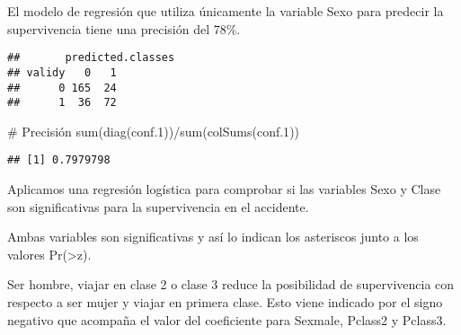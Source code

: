 \documentclass[
]{article}
\newenvironment{Shaded}{\begin{snugshade}}{\end{snugshade}}
\newcommand{\CommentTok}[1]{\textcolor[rgb]{0.50,0.62,0.50}{#1}}
\newcommand{\DataTypeTok}[1]{\textcolor[rgb]{0.87,0.87,0.75}{#1}}
\newcommand{\DecValTok}[1]{\textcolor[rgb]{0.86,0.86,0.80}{#1}}
\newcommand{\FloatTok}[1]{\textcolor[rgb]{0.75,0.75,0.82}{#1}}
\newcommand{\KeywordTok}[1]{\textcolor[rgb]{0.94,0.87,0.69}{#1}}
\newcommand{\NormalTok}[1]{\textcolor[rgb]{0.80,0.80,0.80}{#1}}
\newcommand{\OperatorTok}[1]{\textcolor[rgb]{0.94,0.94,0.82}{#1}}
\newcommand{\StringTok}[1]{\textcolor[rgb]{0.80,0.58,0.58}{#1}}
\begin{document}
El modelo de regresión que utiliza únicamente la variable Sexo para
predecir la supervivencia tiene una precisión del 78\%.

\begin{Shaded}
\end{Shaded}

\begin{verbatim}
##       predicted.classes
## validy   0   1
##      0 165  24
##      1  36  72
\end{verbatim}

\begin{Shaded}
\begin{Highlighting}[]
\CommentTok{# Precisión}
\KeywordTok{sum}\NormalTok{(}\KeywordTok{diag}\NormalTok{(conf}\FloatTok{.1}\NormalTok{))}\OperatorTok{/}\KeywordTok{sum}\NormalTok{(}\KeywordTok{colSums}\NormalTok{(conf}\FloatTok{.1}\NormalTok{))}
\end{Highlighting}
\end{Shaded}

\begin{verbatim}
## [1] 0.7979798
\end{verbatim}

Aplicamos una regresión logística para comprobar si las variables Sexo y
Clase son significativas para la supervivencia en el accidente.

Ambas variables son significativas y así lo indican los asteriscos junto
a los valores Pr(\textgreater\textbar z\textbar).

Ser hombre, viajar en clase 2 o clase 3 reduce la posibilidad de
supervivencia con respecto a ser mujer y viajar en primera clase. Esto
viene indicado por el signo negativo que acompaña el valor del
coeficiente para Sexmale, Pclass2 y Pclass3.
\end{document}

